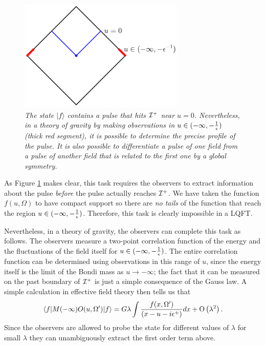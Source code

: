 \documentclass[12pt]{article}
\def\gnewt{G}
\def\Or[#1]{{\text{O}}\left({#1}\right)}
\newcommand{\be}{\begin{equation}}
\newcommand{\ee}{\end{equation}}
\def \sph{{\Omega}}
\def \scrip{{\cal I}^{+}}
\begin{document}
\begin{figure}[!ht]
\begin{center}
\includegraphics[width=0.7\textwidth]{flatexc.pdf}
\caption{\em The state $|f \rangle$ contains a pulse that hits $\scrip$ near $u = 0$. Nevertheless, in a theory of gravity by making observations in $u \in (-\infty, -{1 \over \epsilon})$ (thick red segment), it is possible
to determine the precise profile of the pulse. It is also possible to differentiate a pulse of one field from a pulse of another field that is related to the first one by a global symmetry. \label{figpulse}}
\end{center}
\end{figure}
As Figure \ref{figpulse} makes clear, this task requires the observers to extract information about the pulse {\em before} the pulse actually reaches $\scrip$. We have taken the function $f(u, \Omega)$ to have compact support so there are {\em no tails} of the function that reach the region $u \in (-\infty, -{1 \over \epsilon})$. Therefore, this task is clearly impossible in a LQFT. 

Nevertheless, in a theory of gravity, the observers can complete this task as follows. The observers measure a  two-point correlation function of the energy and the fluctuations of the field itself for $u \in (-\infty, -{1 \over \epsilon})$. The entire correlation function can be determined using observations in this range of $u$, since the energy itself is the limit of the Bondi mass as $u \rightarrow -\infty$;  the fact that it can be measured on the past boundary of $\scrip$ is just a simple consequence of the Gauss law. A simple calculation in effective field theory then tells us that
\be
\label{fresult}
\langle f | M(-\infty) O(u, \sph') | f \rangle =  \gnewt \lambda \int {f(x, \sph') \over (x - u - i \epsilon^{+})} d x + \Or[\lambda^2].
\ee
Since the observers are allowed to probe the state for different values of $\lambda$ for small $\lambda$ they can unambiguously extract the first order term above.
\end{document}
